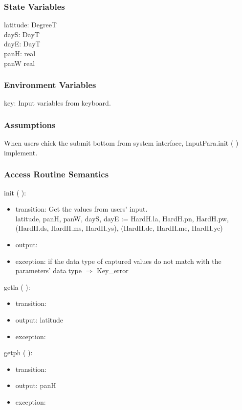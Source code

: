 \documentclass[12pt, titlepage]{article}
\begin{document}
\subsubsection{State Variables}
latitude: DegreeT\\
dayS: DayT \\
dayE: DayT\\
panH: real\\
panW real


\subsubsection{Environment Variables}
key: Input variables from keyboard.

\subsubsection{Assumptions}
When users chick the submit bottom from system interface, InputPara.init ( ) implement.

\subsubsection{ Access Routine Semantics}

\noindent  init ( ):
\begin{itemize}
\item transition: Get the values from users' input.\\
latitude, panH, panW, dayS, dayE := HardH.la, HardH.pn, HardH.pw, (HardH.ds, HardH.ms, HardH.ys), (HardH.de, HardH.me, HardH.ye)
\item output:
\item exception: if the data type of captured values do not match with the parameters' data type $\Rightarrow$ Key\_error
\end{itemize}

\noindent  getla ( ):
\begin{itemize}
\item transition: 
\item output: latitude
\item exception: 
\end{itemize}

\noindent  getph ( ):
\begin{itemize}
\item transition: 
\item output: panH
\item exception: 
\end{itemize}
\end{document}
